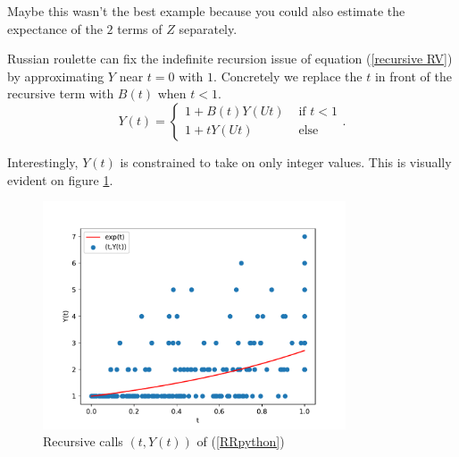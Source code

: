 \documentclass[a4paper,12pt]{article}
\begin{document}
Maybe this wasn't the best example because you could also estimate the expectance of the
$2$ terms of $Z$ separately.

\begin{example}
    Russian roulette can fix the indefinite recursion issue of
    equation (\ref{recursive RV}) by approximating $Y$ near $t = 0$ with $1$. Concretely
    we replace the $t$ in front of the recursive term with $B(t)$
    when $t<1$.
    \[
        Y(t) =
        \begin{cases}
            1 + B(t)Y(Ut) & \text{ if } t<1 \\
            1 + tY(Ut)    & \text{ else}
        \end{cases}
        .\]
\end{example}

\vspace{0.2cm}

\begin{pythonn} \label{RRpython}
    Interestingly, $Y(t)$ is constrained to take on only integer values.
    This is visually evident on figure \ref{plt russian roulette}.
    \begin{figure}[h!]
        \vspace*{-1cm}
        \begin{center}
            \includegraphics[width=0.8\textwidth]{plots/russian roulette example.pdf}
        \end{center}
        \vspace*{-1cm}
        \caption{Recursive calls $(t,Y(t))$ of (\ref{RRpython}) }
        \label{plt russian roulette}
    \end{figure}

\end{pythonn}
\end{document}
